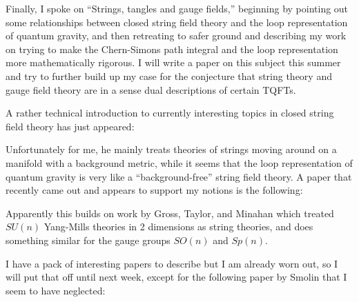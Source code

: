 \documentclass{article}
\def\tightlist{}
\renewcommand{\texttt}[1]{%
  \begingroup
  \ttfamily
  \begingroup\lccode`~=`/\lowercase{\endgroup\def~}{/\discretionary{}{}{}}%
  \begingroup\lccode`~=`[\lowercase{\endgroup\def~}{[\discretionary{}{}{}}%
  \begingroup\lccode`~=`.\lowercase{\endgroup\def~}{.\discretionary{}{}{}}%
  \catcode`/=\active\catcode`[=\active\catcode`.=\active
  \scantokens{#1\noexpand}%
  \endgroup
}
\begin{document}
Finally, I spoke on ``Strings, tangles and gauge fields,'' beginning by
pointing out some relationships between closed string field theory and
the loop representation of quantum gravity, and then retreating to safer
ground and describing my work on trying to make the Chern-Simons path
integral and the loop representation more mathematically rigorous. I
will write a paper on this subject this summer and try to further build
up my case for the conjecture that string theory and gauge field theory
are in a sense dual descriptions of certain TQFTs.

A rather technical introduction to currently interesting topics in
closed string field theory has just appeared:


Unfortunately for me, he mainly treats theories of strings moving around
on a manifold with a background metric, while it seems that the loop
representation of quantum gravity is very like a ``background-free''
string field theory. A paper that recently came out and appears to
support my notions is the following:


Apparently this builds on work by Gross, Taylor, and Minahan which
treated \(SU(n)\) Yang-Mills theories in 2 dimensions as string
theories, and does something similar for the gauge groups \(SO(n)\) and
\(Sp(n)\).

I have a pack of interesting papers to describe but I am already worn
out, so I will put that off until next week, except for the following
paper by Smolin that I seem to have neglected:
\end{document}
